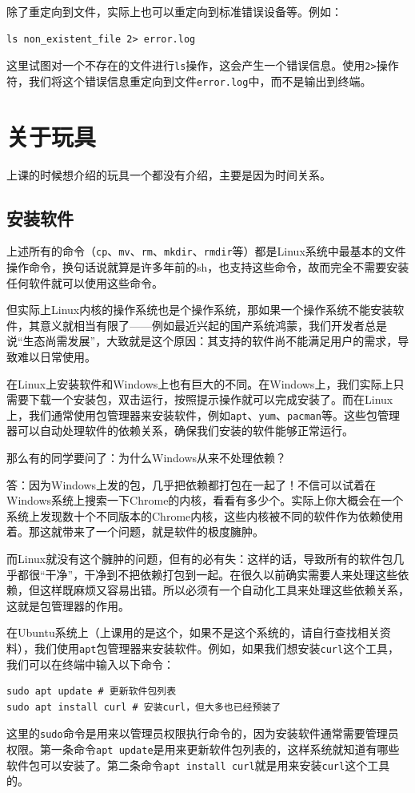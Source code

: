 \documentclass[12pt]{ctexart}
\begin{document}
除了重定向到文件，实际上也可以重定向到标准错误设备等。例如：
\begin{verbatim}
ls non_existent_file 2> error.log
\end{verbatim}
这里试图对一个不存在的文件进行\texttt{ls}操作，这会产生一个错误信息。使用\texttt{2>}操作符，我们将这个错误信息重定向到文件\texttt{error.log}中，而不是输出到终端。

\section{关于玩具}

上课的时候想介绍的玩具一个都没有介绍，主要是因为时间关系。

\subsection{安装软件}
上述所有的命令（\texttt{cp}、\texttt{mv}、\texttt{rm}、\texttt{mkdir}、\texttt{rmdir}等）都是Linux系统中最基本的文件操作命令，换句话说就算是许多年前的sh，也支持这些命令，故而完全不需要安装任何软件就可以使用这些命令。

但实际上Linux内核的操作系统也是个操作系统，那如果一个操作系统不能安装软件，其意义就相当有限了——例如最近兴起的国产系统鸿蒙，我们开发者总是说“生态尚需发展”，大致就是这个原因：其支持的软件尚不能满足用户的需求，导致难以日常使用。

在Linux上安装软件和Windows上也有巨大的不同。在Windows上，我们实际上只需要下载一个安装包，双击运行，按照提示操作就可以完成安装了。而在Linux上，我们通常使用包管理器来安装软件，例如\texttt{apt}、\texttt{yum}、\texttt{pacman}等。这些包管理器可以自动处理软件的依赖关系，确保我们安装的软件能够正常运行。

那么有的同学要问了：为什么Windows从来不处理依赖？

答：因为Windows上发的包，几乎把依赖都打包在一起了！不信可以试着在Windows系统上搜索一下Chrome的内核，看看有多少个。实际上你大概会在一个系统上发现数十个不同版本的Chrome内核，这些内核被不同的软件作为依赖使用着。那这就带来了一个问题，就是软件的极度臃肿。

而Linux就没有这个臃肿的问题，但有的必有失：这样的话，导致所有的软件包几乎都很“干净”，干净到不把依赖打包到一起。在很久以前确实需要人来处理这些依赖，但这样既麻烦又容易出错。所以必须有一个自动化工具来处理这些依赖关系，这就是包管理器的作用。

在Ubuntu系统上（上课用的是这个，如果不是这个系统的，请自行查找相关资料），我们使用\texttt{apt}包管理器来安装软件。例如，如果我们想安装\texttt{curl}这个工具，我们可以在终端中输入以下命令：
\begin{verbatim}
sudo apt update # 更新软件包列表
sudo apt install curl # 安装curl，但大多也已经预装了
\end{verbatim}
这里的\texttt{sudo}命令是用来以管理员权限执行命令的，因为安装软件通常需要管理员权限。第一条命令\texttt{apt update}是用来更新软件包列表的，这样系统就知道有哪些软件包可以安装了。第二条命令\texttt{apt install curl}就是用来安装\texttt{curl}这个工具的。
\end{document}
